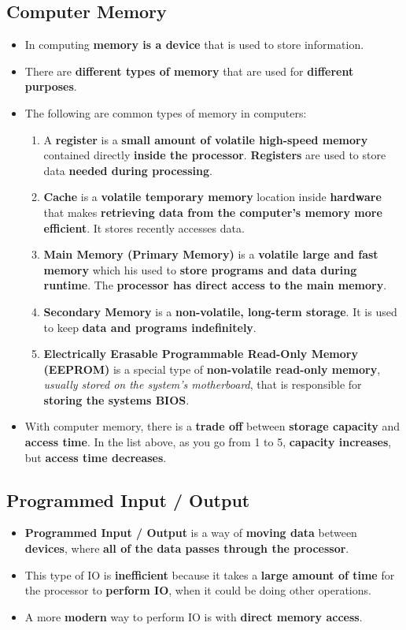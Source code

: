 \documentclass[16pt]{article}
\begin{document}
    \subsection*{Computer Memory}
    \begin{itemize}
        \item In computing \textbf{memory is a device} that is used to store information.
        \item There are \textbf{different types of memory} that are used for \textbf{different purposes}.
        \item The following are common types of memory in computers:
        \begin{enumerate}
            \item A \textbf{register} is a \textbf{small amount of volatile high-speed memory} contained directly \textbf{inside the processor}. \textbf{Registers} are used to store data \textbf{needed during processing}.
            \item \textbf{Cache} is a \textbf{volatile temporary memory} location inside \textbf{hardware} that makes \textbf{retrieving data from the computer's memory more efficient}. It stores recently accesses data.
            \item \textbf{Main Memory (Primary Memory)} is a \textbf{volatile large and fast memory} which his used to \textbf{store programs and data during runtime}. The \textbf{processor has direct access to the main memory}.
            \item \textbf{Secondary Memory} is a \textbf{non-volatile, long-term storage}. It is used to keep \textbf{data and programs indefinitely}.
            \item \textbf{Electrically Erasable Programmable Read-Only Memory (EEPROM)} is a special type of \textbf{non-volatile read-only memory}, \textit{usually stored on the system's motherboard}, that is responsible for \textbf{storing the systems BIOS}.
        \end{enumerate}
        \item With computer memory, there is a \textbf{trade off} between \textbf{storage capacity} and \textbf{access time}. In the list above, as you go from 1 to 5, \textbf{capacity increases}, but \textbf{access time decreases}.
    \end{itemize}

    \subsection*{Programmed Input / Output}
    \begin{itemize}
        \item \textbf{Programmed Input / Output} is a way of \textbf{moving data} between \textbf{devices}, where \textbf{all of the data passes through the processor}.
        \item This type of IO is \textbf{inefficient} because it takes a \textbf{large amount of time} for the processor to \textbf{perform IO}, when it could be doing other operations.
        \item A more \textbf{modern} way to perform IO is with \textbf{direct memory access}.
    \end{itemize}
\end{document}

